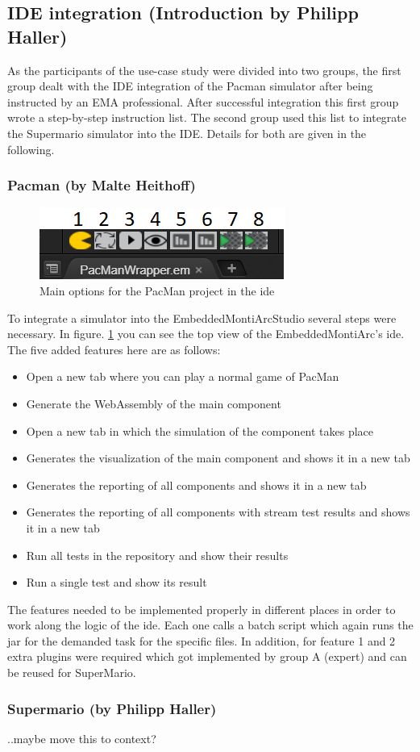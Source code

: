\subsection{IDE integration (Introduction by Philipp Haller)}

As the participants of the use-case study were divided into two groups, the first group dealt with the IDE integration of the Pacman simulator after being instructed by an EMA professional.
After successful integration this first group wrote a step-by-step instruction list. The second group used this list to integrate the Supermario simulator into the IDE. Details for both are given in the following.

\subsubsection{Pacman (by Malte Heithoff)}
\begin{figure}
	\label{fig:idePacmanTop}
	\centering
	\includegraphics[scale=0.55]{pictures/IDE/IDETop.png}
	\caption{Main options for the PacMan project in the ide}
\end{figure}
To integrate a simulator into the EmbeddedMontiArcStudio several steps were necessary. In figure. \ref{fig:idePacmanTop} you can see the top view of the EmbeddedMontiArc's ide. The five added features here are as follows:
\begin{itemize}
	\item[1.] Open a new tab where you can play a normal game of PacMan
	\item[2.] Generate the WebAssembly of the main component
	\item[3.] Open a new tab in which the simulation of the component takes place
	\item[4.] Generates the visualization of the main component and shows it in a new tab
	\item[5.] Generates the reporting of all components and shows it in a new tab
	\item[6.] Generates the reporting of all components with stream test results and shows it in a new tab
	\item[7.] Run all tests in the repository and show their results
	\item[8.] Run a single test and show its result
\end{itemize}
The features needed to be implemented properly in different places in order to work along the logic of the ide. Each one calls a batch script which again runs the jar for the demanded task for the specific files. In addition, for feature 1 and 2 extra plugins were required which got implemented by group A (expert) and can be reused for SuperMario.

\subsubsection{Supermario (by Philipp Haller)}
..maybe move this to context?